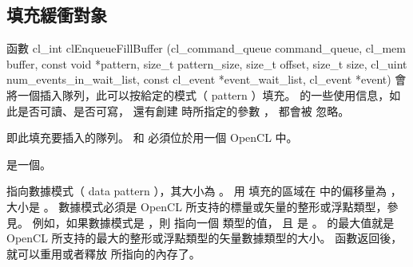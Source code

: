 \subsection{填充緩衝對象}

函數
\startclc
cl_int clEnqueueFillBuffer (cl_command_queue command_queue,
			cl_mem buffer,
			const void *pattern,
			size_t pattern_size,
			size_t offset,
			size_t size,
			cl_uint num_events_in_wait_list,
			const cl_event *event_wait_list,
			cl_event *event)
\stopclc
會將一個插入隊列，此可以按給定的模式（ pattern ）填充。
 的一些使用信息，如此是否可讀、是否可寫，
還有創建  時所指定的參數 ，
都會被  忽略。

 即此填充要插入的隊列。
 和  必須位於用一個 OpenCL 中。

 是一個。

 指向數據模式（ data pattern ），其大小為 。
用  填充的區域在  中的偏移量為 ，大小是 。
數據模式必須是 OpenCL 所支持的標量或矢量的整形或浮點類型，參見。
例如，如果數據模式是 ，則  指向一個  類型的值，
且  是 。
 的最大值就是 OpenCL 所支持的最大的整形或浮點類型的矢量數據類型的大小。
函數返回後，就可以重用或者釋放  所指向的內存了。

